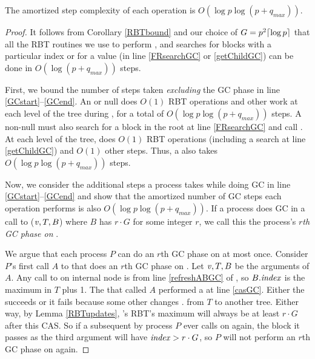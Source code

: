 \begin{mytheorem}
The amortized step complexity of each operation is $O(\log p \log(p+q_{max}))$.
\end{mytheorem}
\begin{proof}
It follows from Corollary \ref{RBTbound} and our choice of $G=p^2\lceil \log p \rceil$
that all the RBT routines we use to perform ,  and searches for
blocks with a particular index or for a  value (in line \ref{FRsearchGC} or \ref{getChildGC}) can  be done in $O(\log(p+q_{max}))$ steps.

First, we bound the number of steps taken \emph{excluding} the GC phase in line \ref{GCstart}--\ref{GCend}.
An  or null  does $O(1)$ RBT operations and other work at each level of the tree during ,
for a total of $O(\log p \log(p+q_{max}))$ steps.
A non-null  must also search for a block in the root at line \ref{FRsearchGC}
and call .  At each level of the tree,  does $O(1)$ RBT operations (including a search at line \ref{getChildGC}) and $O(1)$ other steps.
Thus, a  also takes $O(\log p \log(p+q_{max}))$ steps.

Now, we consider the additional steps a process takes while doing GC in line \ref{GCstart}--\ref{GCend}
and show that the amortized number of GC steps each operation performs is also $O(\log p\log(p+q_{max}))$.
If a process does GC in a call to ($\mbox{\textnormal{\textit{v}}},T,B$) where $B$ has  $r\cdot G$ for some integer $r$, we call this the process's \emph{$r$th GC phase on }.

We argue that each process $P$ can do an $r$th GC phase on  at most once.
Consider $P$'s first call $A$ to  that does an $r$th GC phase on .
Let $\mbox{\textnormal{\textit{v}}},T,B$ be the arguments of $A$.
Any call to  on internal node  is from line \ref{refreshABGC} of , so $B.\mbox{\textit{index}}$
is the maximum  in $T$ plus 1.
The  that called $A$ performed a  at line \ref{casGC}.  Either the  succeeds
or it fails because 
some other  changes . from $T$ to another tree.
Either way, by Lemma \ref{RBTupdates}, 's RBT's maximum  will always be at least $r\cdot G$ 
after this CAS.
So if a subsequent  by process $P$ 
ever calls  on  again, the block it passes as the third argument
will have $\mbox{\textit{index}}>r\cdot G$, so $P$ will not perform an $r$th GC phase on  again.


\end{proof}
